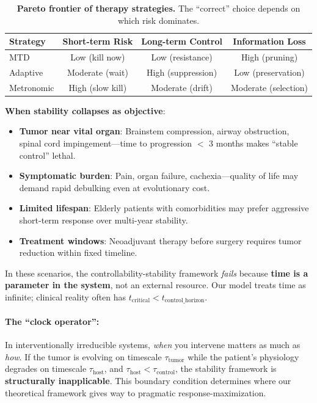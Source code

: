\documentclass[11pt,a4paper]{article}
\begin{document}
\begin{table}[h]
\centering
\small
\begin{tabular}{|l|c|c|c|}
\hline
\textbf{Strategy} & \textbf{Short-term Risk} & \textbf{Long-term Control} & \textbf{Information Loss} \\
\hline
MTD & Low (kill now) & Low (resistance) & High (pruning) \\
\hline
Adaptive & Moderate (wait) & High (suppression) & Low (preservation) \\
\hline
Metronomic & High (slow kill) & Moderate (drift) & Moderate (selection) \\
\hline
\end{tabular}
\caption{\textbf{Pareto frontier of therapy strategies.} The ``correct'' choice depends on which risk dominates.}
\label{tab:pareto}
\end{table}

\textbf{When stability collapses as objective}:
\begin{itemize}
    \item \textbf{Tumor near vital organ}: Brainstem compression, airway obstruction, spinal cord impingement---time to progression $<$ 3 months makes ``stable control'' lethal.
    \item \textbf{Symptomatic burden}: Pain, organ failure, cachexia---quality of life may demand rapid debulking even at evolutionary cost.
    \item \textbf{Limited lifespan}: Elderly patients with comorbidities may prefer aggressive short-term response over multi-year stability.
    \item \textbf{Treatment windows}: Neoadjuvant therapy before surgery requires tumor reduction within fixed timeline.
\end{itemize}

In these scenarios, the controllability-stability framework \textit{fails} because \textbf{time is a parameter in the system}, not an external resource. Our model treats time as infinite; clinical reality often has $t_{\text{critical}} < t_{\text{control\_horizon}}$.

\paragraph{The ``clock operator'':} In interventionally irreducible systems, \textit{when} you intervene matters as much as \textit{how}. If the tumor is evolving on timescale $\tau_{\text{tumor}}$ while the patient's physiology degrades on timescale $\tau_{\text{host}}$, and $\tau_{\text{host}} < \tau_{\text{control}}$, the stability framework is \textbf{structurally inapplicable}. This boundary condition determines where our theoretical framework gives way to pragmatic response-maximization.
\end{document}
